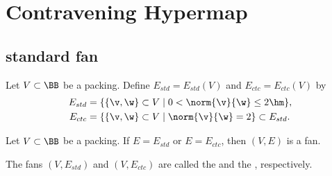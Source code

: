 
\figHBMVLMY %

%

\section{Contravening Hypermap}

\subsection{standard fan}

Let $V\subset \BB$ be a packing.  Define $E_{std}=E_{std}(V)$ and $E_{ctc}=E_{ctc}(V)$
by
\begin{align}\label{eqn:fan-edge}
E_{std} &= \{\{\v,\w\}\subset V\mid 0 < \norm{\v}{\w}\le 2\hm \},\\
E_{ctc} &= \{ \{\v,\w\}\subset V\mid \norm{\v}{\w}= 2 \}\subset E_{std}.
\end{align}

\begin{lemma}[]\label{lemma:ctc-fan}
Let $V\subset \BB$ be a packing.  If $E=E_{std}$ or $E=E_{ctc}$, then
$(V,E)$ is a fan.
\end{lemma}

\begin{definition}
The fans $(V,E_{std})$ and $(V,E_{ctc})$ are called the  and
the , respectively.  
\end{definition}
%
%
%
%
%
%
%

